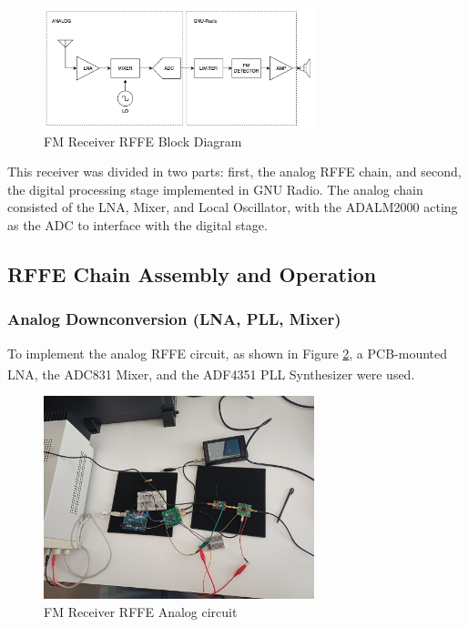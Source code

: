 \begin{figure}[H]
    \centering
    \includegraphics*[width=0.7\textwidth]{Images/RFFE_Block.png}
    \caption{FM Receiver RFFE Block Diagram}
    \label{fig:RFFE_Block}
\end{figure}

This receiver was divided in two parts: first, the analog RFFE chain, and second, the digital processing stage implemented in GNU Radio. The analog chain consisted of the LNA, Mixer, and Local Oscillator, with the ADALM2000 acting as the ADC to interface with the digital stage.

\subsection{RFFE Chain Assembly and Operation}

\subsubsection{Analog Downconversion (LNA, PLL, Mixer)}
To implement the analog RFFE circuit, as shown in Figure \ref{fig:RFFE_Circuit}, a PCB-mounted LNA, the ADC831 Mixer, and the ADF4351 PLL Synthesizer \textsuperscript{\cite{adf4351:datasheet}} were used.
\begin{figure}[H]
    \centering
    \includegraphics*[width=0.7\textwidth]{Images/RFFE_Circuit.jpeg}
    \caption{FM Receiver RFFE Analog circuit}
    \label{fig:RFFE_Circuit}
\end{figure}

